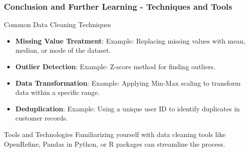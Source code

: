 \documentclass[aspectratio=169]{beamer}
\begin{document}
\begin{frame}[fragile]
    \frametitle{Conclusion and Further Learning - Techniques and Tools}
    \begin{block}{Common Data Cleaning Techniques}
        \begin{itemize}
            \item \textbf{Missing Value Treatment}:
            Example: Replacing missing values with mean, median, or mode of the dataset.
            \item \textbf{Outlier Detection}:
            Example: Z-score method for finding outliers.
            \item \textbf{Data Transformation}:
            Example: Applying Min-Max scaling to transform data within a specific range.
            \item \textbf{Deduplication}:
            Example: Using a unique user ID to identify duplicates in customer records.
        \end{itemize}
    \end{block}

    \begin{block}{Tools and Technologies}
        Familiarizing yourself with data cleaning tools like OpenRefine, Pandas in Python, or R packages can streamline the process.
    \end{block}
\end{frame}
\end{document}
